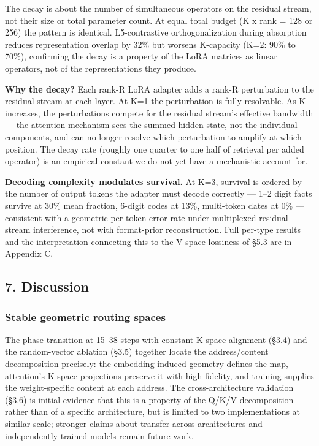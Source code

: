 The decay is about the number of simultaneous operators on the residual stream, not their size or total parameter count. At equal total budget (K x rank = 128 or 256) the pattern is identical. L5-contrastive orthogonalization during absorption reduces representation overlap by 32\% but worsens K-capacity (K=2: 90\% to 70\%), confirming the decay is a property of the LoRA matrices as linear operators, not of the representations they produce.

\textbf{Why the decay?} Each rank-R LoRA adapter adds a rank-R perturbation to the residual stream at each layer. At K=1 the perturbation is fully resolvable. As K increases, the perturbations compete for the residual stream's effective bandwidth --- the attention mechanism sees the summed hidden state, not the individual components, and can no longer resolve which perturbation to amplify at which position. The decay rate (roughly one quarter to one half of retrieval per added operator) is an empirical constant we do not yet have a mechanistic account for.

\textbf{Decoding complexity modulates survival.} At K=3, survival is ordered by the number of output tokens the adapter must decode correctly --- 1--2 digit facts survive at 30\% mean fraction, 6-digit codes at 13\%, multi-token dates at 0\% --- consistent with a geometric per-token error rate under multiplexed residual-stream interference, not with format-prior reconstruction. Full per-type results and the interpretation connecting this to the V-space lossiness of §5.3 are in Appendix C.

\subsection{7. Discussion}\label{discussion}

\subsubsection{Stable geometric routing spaces}\label{stable-geometric-routing-spaces}

The phase transition at 15--38 steps with constant K-space alignment (§3.4) and the random-vector ablation (§3.5) together locate the address/content decomposition precisely: the embedding-induced geometry defines the map, attention's K-space projections preserve it with high fidelity, and training supplies the weight-specific content at each address. The cross-architecture validation (§3.6) is initial evidence that this is a property of the Q/K/V decomposition rather than of a specific architecture, but is limited to two implementations at similar scale; stronger claims about transfer across architectures and independently trained models remain future work.

